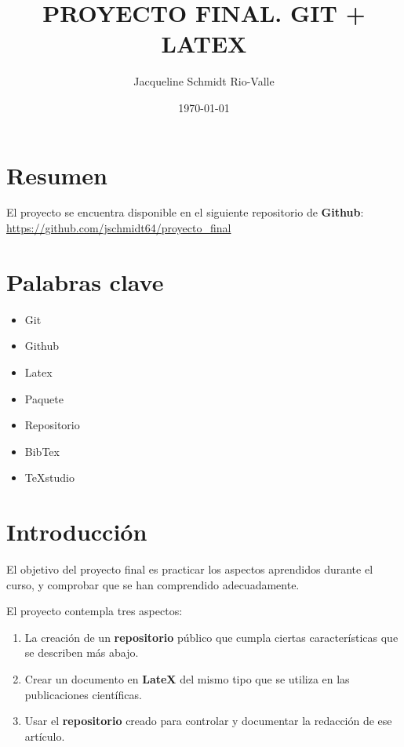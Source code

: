 \documentclass[a4paper,11pt]{article}
\title{\Huge{\textbf{PROYECTO FINAL. GIT + LATEX}}}
\author{\LARGE{Jacqueline Schmidt Rio-Valle}}
\date{\today}
\begin{document}
\maketitle	
	
\newpage	
	
\tableofcontents	

\newpage
	
\section{Resumen}

El proyecto se encuentra disponible en el siguiente repositorio de \textbf{Github}: \url{https://github.com/jschmidt64/proyecto_final}

\section{Palabras clave}

\begin{itemize}
	\item Git
	\item Github
	\item Latex
	\item Paquete
	\item Repositorio
	\item BibTex
	\item TeXstudio
\end{itemize}

\section{Introducción}

El objetivo del proyecto final es practicar los aspectos aprendidos durante el curso, y comprobar que se han comprendido adecuadamente.

El proyecto contempla tres aspectos:

\begin{enumerate}
	\item La creación de un \textbf{repositorio} público que cumpla ciertas características que se describen más abajo.
	\item Crear un documento en \textbf{LateX} del mismo tipo que se utiliza en las publicaciones científicas.
	\item Usar el \textbf{repositorio} creado para controlar y documentar la redacción de ese artículo.
\end{enumerate}
\end{document}
